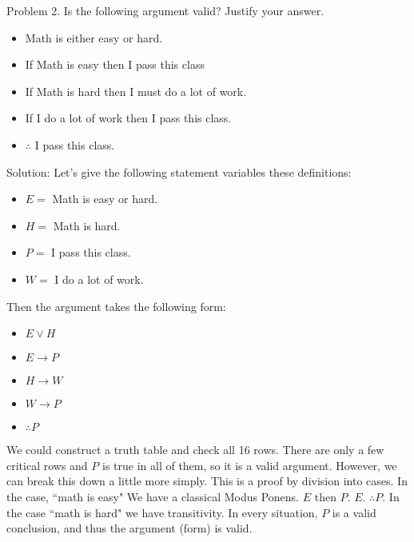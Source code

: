 \documentclass[16 pt]{amsart}
\theoremstyle{definition}
\theoremstyle{remark}
\numberwithin{equation}{subsection}
\begin{document}
\newpage
Problem 2. Is the following argument valid?  Justify your answer.


\begin{itemize}
\item[] Math is either easy or hard.\\
\item[] If Math is easy then I pass this class\\
\item[] If Math is hard then I must do a lot of work.\\
\item[] If I do a lot of work then I pass this class.\\
\item[] $\therefore$  I pass this class.
\end{itemize}

\vspace{1in}

Solution: Let's give the following statement variables these definitions: 

\begin{itemize}
\item[] $E = $ Math is easy or hard.\\
\item[] $H = $ Math is hard.\\
\item[] $P = $ I pass this class.\\
\item[] $W = $ I do a lot of work.\\
\end{itemize}

Then the argument takes the following form:

\begin{itemize}
\item[] $E \vee H$\\
\item[] $E \rightarrow P$ \\
\item[] $H \rightarrow W$\\
\item[] $W \rightarrow P$\\
\item[] $\therefore P$  
\end{itemize}

We could construct a truth table and check all 16 rows.  There are only a few critical rows and $P$ is true in all of them, so it is a valid argument.  However, we can break this down a little more simply.  This is a proof by division into cases.  In the case, ``math is easy" We have a classical Modus Ponens.  $E$ then $P$.  $E$.  $\therefore P$.  In the case ``math is hard" we have transitivity.  In every situation, $P$ is a valid conclusion, and thus the argument (form) is valid.
\end{document}

